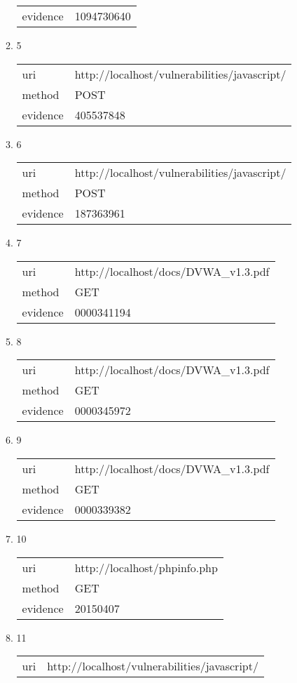 \documentclass[10pt]{article}
\begin{document}
\begin{itemize}
\begin{enumerate}
\begin{tabular}{| l | p{14cm}}
evidence & 1094730640 \\
\end{tabular}
\item[] 5
\begin{tabular}{| l | p{14cm}}
uri & http://localhost/vulnerabilities/javascript/ \\
method & POST \\
evidence & 405537848 \\
\end{tabular}
\item[] 6
\begin{tabular}{| l | p{14cm}}
uri & http://localhost/vulnerabilities/javascript/ \\
method & POST \\
evidence & 187363961 \\
\end{tabular}
\item[] 7
\begin{tabular}{| l | p{14cm}}
uri & http://localhost/docs/DVWA{\_}v1.3.pdf \\
method & GET \\
evidence & 0000341194 \\
\end{tabular}
\item[] 8
\begin{tabular}{| l | p{14cm}}
uri & http://localhost/docs/DVWA{\_}v1.3.pdf \\
method & GET \\
evidence & 0000345972 \\
\end{tabular}
\item[] 9
\begin{tabular}{| l | p{14cm}}
uri & http://localhost/docs/DVWA{\_}v1.3.pdf \\
method & GET \\
evidence & 0000339382 \\
\end{tabular}
\item[] 10
\begin{tabular}{| l | p{14cm}}
uri & http://localhost/phpinfo.php \\
method & GET \\
evidence & 20150407 \\
\end{tabular}
\item[] 11
\begin{tabular}{| l | p{14cm}}
uri & http://localhost/vulnerabilities/javascript/ \\

\end{tabular}
\end{enumerate}
\end{itemize}
\end{document}
